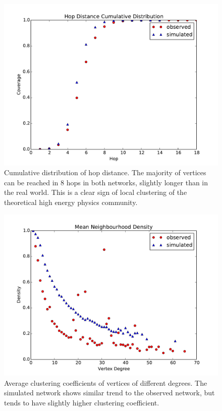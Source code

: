 \documentclass[11pt,a4paper]{article}
\begin{document}
\begin{figure}[htbp]
	\centering
	\includegraphics[scale=0.55]{exp_hop_distro.pdf}
	\caption{Cumulative distribution of hop distance. The majority of vertices can be reached in 8 hops in both networks, slightly longer than in the real world. This is a clear sign of local clustering of the theoretical high energy physics community.}
	\label{fig:exp_hop_distro}
\end{figure}
\begin{figure}[htbp]
	\centering
	\includegraphics[scale=0.55]{exp_neighbourhood_densities.pdf}
	\caption{Average clustering coefficients of vertices of different degrees. The simulated network shows similar trend to the observed network, but tends to have slightly higher clustering coefficient.}
	\label{fig:exp_neighbourhood_densities}
\end{figure}
\end{document}
